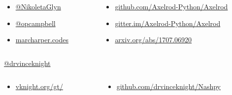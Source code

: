 \documentclass{beamer}
\begin{document}
 \begin{frame}
   \begin{columns}
        \begin{column}{.35\textwidth}
            \begin{itemize}
                \item \href{https://twitter.com/NikoletaGlyn}{@NikoletaGlyn}
                \item \href{https://twitter.com/opcampbell}{@opcampbell}
                \item \href{http://marcharper.codes/}{marcharper.codes}
            \end{itemize}
        \end{column}
        \begin{column}{.65\textwidth}
            \begin{itemize}
                \item \href{https://github.com/Axelrod-Python/Axelrod}{github.com/Axelrod-Python/Axelrod}
                \item \href{https://gitter.im/Axelrod-Python/Axelrod}{gitter.im/Axelrod-Python/Axelrod}
                \item
                    \href{https://arxiv.org/abs/1707.06920}{arxiv.org/abs/1707.06920}
            \end{itemize}
        \end{column}
   \end{columns}

        \begin{center}
               \href{https://twitter.com/drvinceknight}{@drvinceknight}
        \end{center}

   \begin{columns}
        \begin{column}{.4\textwidth}
            \begin{itemize}
                \item
                    \href{https://vknight.org/gt/}{vknight.org/gt/}
            \end{itemize}
        \end{column}
        \begin{column}{.6\textwidth}
            \begin{itemize}
                \item \href{https://github.com/drvinceknight/Nashpy}{github.com/drvinceknight/Nashpy}
            \end{itemize}
        \end{column}
   \end{columns}
\end{frame}
\end{document}
